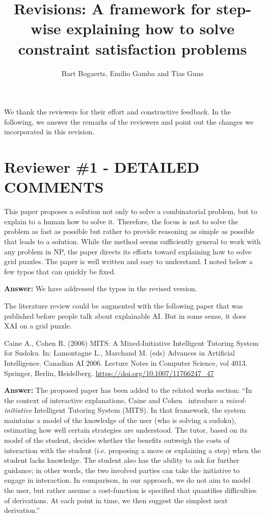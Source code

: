 \documentclass{article}
\title{Revisions: A framework for step-wise explaining how to solve constraint satisfaction problems}
\author{Bart Bogaerts, Emilio Gamba and Tias Guns}
\date{}
\newcommand\comment[1]{\marginpar{\tiny #1}}
\renewcommand\comment[1]{#1}
\newcommand{\tias}[1]{{\comment{\color{blue}\textsc{TG:}#1}}}
\newcommand{\answer}[1]{{\comment{\textbf{Answer:} #1}}}
\begin{document}
	\maketitle
We thank the reviewers for their effort and constructive feedback. In the following, we answer the remarks of the reviewers and point out the changes we incorporated in this revision.

\section*{Reviewer \#1 - DETAILED COMMENTS}

\begin{quoteit}
	This paper proposes a solution not only to solve a combinatorial
	problem, but to explain to a human how to solve it. Therefore, the
	focus is not to solve the problem as fast as possible but rather to
	provide reasoning as simple as possible that leads to a solution. While
	the method seems sufficiently general to work with any problem in NP,
	the paper directs its efforts toward explaining how to solve grid
	puzzles.
The paper is well written and easy to understand. I noted below a few typos that can quickly be fixed.
\end{quoteit}

\answer{We have addressed the typos in the revised version.}

\begin{quoteit}
The literature review could be augmented with the following paper that was published before people talk about explainable AI. But in some sense, it does XAI on a grid puzzle.

Caine A., Cohen R. (2006) MITS: A Mixed-Initiative Intelligent Tutoring System for Sudoku. In: Lamontagne L., Marchand M. (eds) Advances in Artificial Intelligence. Canadian AI 2006. Lecture Notes in Computer Science, vol 4013. Springer, Berlin, Heidelberg. \url{https://doi.org/10.1007/11766247_47}
\end{quoteit}

\answer{The proposed paper has been added to the related works section: ``In the context of interactive explanations, Caine and Cohen~\cite{caine2006mits} introduce a \emph{mixed-initiative} Intelligent Tutoring System (MITS). 
	In that framework, the system maintains a model of the knowledge of the user (who is solving a sudoku), estimating how well certain strategies are understood. 
	The tutor, based on its model of the student, decides whether the benefits outweigh the costs of interaction with the student (i.e. proposing a move or explaining a step) when the student lacks knowledge. The student also has the ability to ask for further guidance; in other words, the two involved parties can take the initiative to engage in interaction. In comparison, in our approach, we do not aim to model the user, but rather assume a cost-function is specified that quantifies difficulties of derivations. At each point in time, we then suggest the simplest next derivation.''} 
\end{document}
